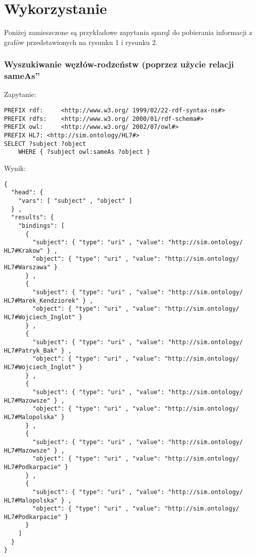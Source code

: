 \section{Wykorzystanie}
\label{cha:impl}

Poniżej zamieszczone są przykładowe zapytania sparql do pobierania informacji z grafów przedstawionych na rysunku 1 i rysunku 2.

\subsubsection{Wyszukiwanie węzłów-rodzeństw (poprzez użycie \quotedblbase relacji sameAs\textquotedblright }

Zapytanie:
\begin{lstlisting}
PREFIX rdf:     <http://www.w3.org/ 1999/02/22-rdf-syntax-ns#> 
PREFIX rdfs:    <http://www.w3.org/ 2000/01/rdf-schema#>
PREFIX owl:     <http://www.w3.org/ 2002/07/owl#>
PREFIX HL7: <http://sim.ontology/HL7#>
SELECT ?subject ?object
	WHERE { ?subject owl:sameAs ?object }
\end{lstlisting}

Wynik:
\begin{lstlisting}
{
  "head": {
    "vars": [ "subject" , "object" ]
  } ,
  "results": {
    "bindings": [
      {
        "subject": { "type": "uri" , "value": "http://sim.ontology/ HL7#Krakow" } ,
        "object": { "type": "uri" , "value": "http://sim.ontology/ HL7#Warszawa" }
      } ,
      {
        "subject": { "type": "uri" , "value": "http://sim.ontology/ HL7#Marek_Kendziorek" } ,
        "object": { "type": "uri" , "value": "http://sim.ontology/ HL7#Wojciech_Inglot" }
      } ,
      {
        "subject": { "type": "uri" , "value": "http://sim.ontology/ HL7#Patryk_Bak" } ,
        "object": { "type": "uri" , "value": "http://sim.ontology/ HL7#Wojciech_Inglot" }
      } ,
      {
        "subject": { "type": "uri" , "value": "http://sim.ontology/ HL7#Mazowsze" } ,
        "object": { "type": "uri" , "value": "http://sim.ontology/ HL7#Malopolska" }
      } ,
      {
        "subject": { "type": "uri" , "value": "http://sim.ontology/ HL7#Mazowsze" } ,
        "object": { "type": "uri" , "value": "http://sim.ontology/ HL7#Podkarpacie" }
      } ,
      {
        "subject": { "type": "uri" , "value": "http://sim.ontology/ HL7#Malopolska" } ,
        "object": { "type": "uri" , "value": "http://sim.ontology/ HL7#Podkarpacie" }
      }
    ]
  }
}

\end{lstlisting}







